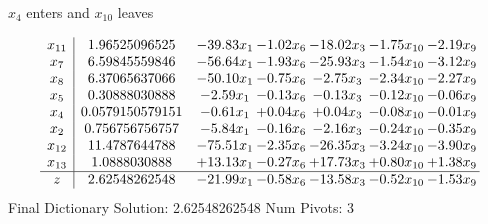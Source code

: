 \documentclass[9pt]{article}
\begin{document}
 $ x_{4} $ enters and $ x_{10} $ leaves 

 \[\begin{array}{c| c c@{\hskip 2pt} c@{\hskip 2pt} c@{\hskip 2pt} c@{\hskip 2pt} c@{\hskip 2pt} }
 x_{11}   &  1.96525096525 & -39.83 x_{1} & -1.02 x_{6} & -18.02 x_{3} & -1.75 x_{10} & -2.19 x_{9}\\
 x_{7}   &  6.59845559846 & -56.64 x_{1} & -1.93 x_{6} & -25.93 x_{3} & -1.54 x_{10} & -3.12 x_{9}\\
 x_{8}   &  6.37065637066 & -50.10 x_{1} & -0.75 x_{6} & -2.75 x_{3} & -2.34 x_{10} & -2.27 x_{9}\\
 x_{5}   &  0.30888030888 & -2.59 x_{1} & -0.13 x_{6} & -0.13 x_{3} & -0.12 x_{10} & -0.06 x_{9}\\
 x_{4}   &  0.0579150579151 & -0.61 x_{1} & +  0.04 x_{6} & +  0.04 x_{3} & -0.08 x_{10} & -0.01 x_{9}\\
 x_{2}   &  0.756756756757 & -5.84 x_{1} & -0.16 x_{6} & -2.16 x_{3} & -0.24 x_{10} & -0.35 x_{9}\\
 x_{12}   &  11.4787644788 & -75.51 x_{1} & -2.35 x_{6} & -26.35 x_{3} & -3.24 x_{10} & -3.90 x_{9}\\
 x_{13}   &  1.0888030888 & + 13.13 x_{1} & -0.27 x_{6} & + 17.73 x_{3} & +  0.80 x_{10} & +  1.38 x_{9}\\
\hline
z    &  2.62548262548 & -21.99 x_{1} & -0.58 x_{6} & -13.58 x_{3} & -0.52 x_{10} & -1.53 x_{9}\\
\end{array}\]
Final Dictionary
Solution:  2.62548262548
Num Pivots:  3
\end{document}

